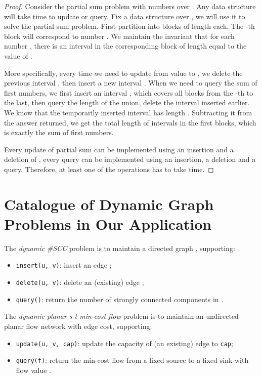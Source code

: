 \documentclass[11pt]{article}
\begin{document}
\begin{proof}
Consider the partial sum problem with  numbers over . Any data structure will take  time to update or query. Fix a \diu{} data structure over , we will use it to solve the partial sum problem. First partition  into  blocks of length  each. The -th block will correspond to number . We maintain the invariant that for each number , there is an interval in the corresponding block of length equal to the value of . 

More specifically, every time we need to update  from value  to , we delete the previous interval , then insert a new interval . When we need to query the sum of first  numbers, we first insert an interval , which covers all blocks from the -th to the last, then query the length of the union, delete the interval inserted earlier. We know that the temporarily inserted interval has length . Subtracting it from the answer returned, we get the total length of intervals in the first  blocks, which is exactly the sum of first  numbers.

Every update of partial sum can be implemented using an insertion and a deletion of \diu{}, every query can be implemented using an insertion, a deletion and a query. Therefore, at least one of the operations has to take  time. 
\end{proof}

\section{Catalogue of Dynamic Graph Problems in Our Application}\label{sectcata}

The \emph{dynamic \#SCC} problem is to maintain a directed graph , supporting:
\begin{itemize}
	\item
		\verb+insert(u, v)+: insert an edge ;
	\item
		\verb+delete(u, v)+: delete an (existing) edge ;
	\item
		\verb+query()+: return the number of strongly connected components in .
\end{itemize}

The \emph{dynamic planar s-t min-cost flow} problem is to maintain an undirected planar flow network  with edge cost, supporting:
\begin{itemize}
	\item
		\verb+update(u, v, cap)+: update the capacity of (an existing) edge  to \verb+cap+;
	\item
		\verb+query(f)+: return the min-cost flow from a fixed source  to a fixed sink  with flow value . 
\end{itemize}
\end{document}
